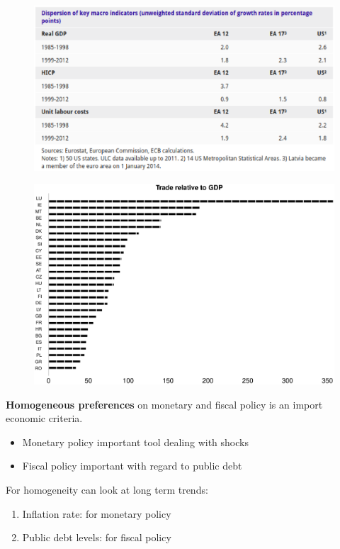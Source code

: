 \documentclass{beamer}
\begin{document}
\begin{frame}
  \begin{figure}
    \includegraphics[scale=.5]{dispersion.eps}
  \end{figure}
\end{frame}

\begin{frame}
  \begin{figure}
    \includegraphics[scale=.3]{openness.eps}
  \end{figure}
\end{frame}

\begin{frame}
  \textbf{Homogeneous preferences} on monetary and fiscal policy is an import economic criteria. 
  \begin{itemize}
    \item Monetary policy important tool dealing with shocks
    \item Fiscal policy important with regard to public debt
  \end{itemize}
  \medskip
   For homogeneity can look at long term trends:  
  \begin{enumerate}
    \item Inflation rate: for monetary policy
    \item Public debt levels: for fiscal policy
  \end{enumerate}
\end{frame}
\end{document}
